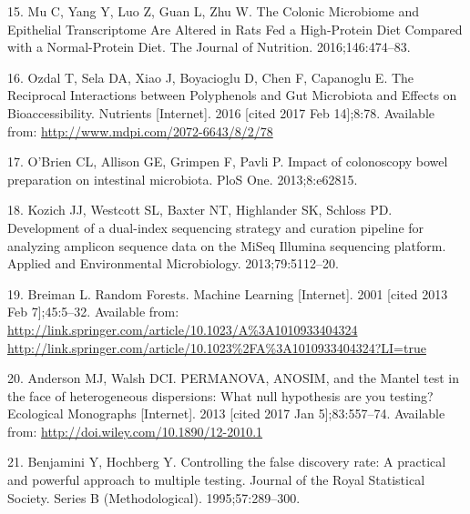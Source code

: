 \documentclass[12pt,]{article}
\begin{document}
\hypertarget{ref-mu_colonic_2016}{}
15. Mu C, Yang Y, Luo Z, Guan L, Zhu W. The Colonic Microbiome and
Epithelial Transcriptome Are Altered in Rats Fed a High-Protein Diet
Compared with a Normal-Protein Diet. The Journal of Nutrition.
2016;146:474--83.

\hypertarget{ref-ozdal_reciprocal_2016}{}
16. Ozdal T, Sela DA, Xiao J, Boyacioglu D, Chen F, Capanoglu E. The
Reciprocal Interactions between Polyphenols and Gut Microbiota and
Effects on Bioaccessibility. Nutrients {[}Internet{]}. 2016 {[}cited
2017 Feb 14{]};8:78. Available from:
\url{http://www.mdpi.com/2072-6643/8/2/78}

\hypertarget{ref-obrien_impact_2013}{}
17. O'Brien CL, Allison GE, Grimpen F, Pavli P. Impact of colonoscopy
bowel preparation on intestinal microbiota. PloS One. 2013;8:e62815.

\hypertarget{ref-kozich_development_2013}{}
18. Kozich JJ, Westcott SL, Baxter NT, Highlander SK, Schloss PD.
Development of a dual-index sequencing strategy and curation pipeline
for analyzing amplicon sequence data on the MiSeq Illumina sequencing
platform. Applied and Environmental Microbiology. 2013;79:5112--20.

\hypertarget{ref-breiman_random_2001}{}
19. Breiman L. Random Forests. Machine Learning {[}Internet{]}. 2001
{[}cited 2013 Feb 7{]};45:5--32. Available from:
\href{http://link.springer.com/article/10.1023/A\%3A1010933404324\%20http://link.springer.com/article/10.1023\%2FA\%3A1010933404324?LI=true}{http://link.springer.com/article/10.1023/A\%3A1010933404324 http://link.springer.com/article/10.1023\%2FA\%3A1010933404324?LI=true}

\hypertarget{ref-anderson_permanova_2013}{}
20. Anderson MJ, Walsh DCI. PERMANOVA, ANOSIM, and the Mantel test in
the face of heterogeneous dispersions: What null hypothesis are you
testing? Ecological Monographs {[}Internet{]}. 2013 {[}cited 2017 Jan
5{]};83:557--74. Available from:
\url{http://doi.wiley.com/10.1890/12-2010.1}

\hypertarget{ref-benjamini_controlling_1995}{}
21. Benjamini Y, Hochberg Y. Controlling the false discovery rate: A
practical and powerful approach to multiple testing. Journal of the
Royal Statistical Society. Series B (Methodological). 1995;57:289--300.
\end{document}
